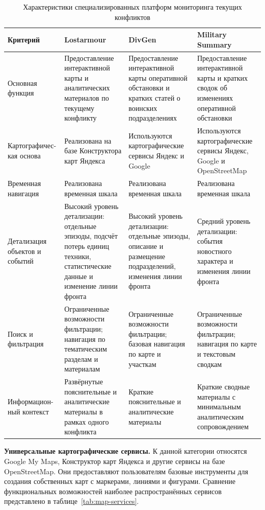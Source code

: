 \begin{table}[H]
\caption{\label{tab:specialized-platforms}Характеристики специализированных платформ мониторинга текущих конфликтов}
\centering
{\footnotesize
\begin{tabular}{|p{2.2cm}|p{4.2cm}|p{4.2cm}|p{4.2cm}|}
\hline
\textbf{Критерий} & \textbf{Lostarmour} & \textbf{DivGen} & \textbf{Military Summary} \\ \hline
Основная функция & Предоставление интерактивной карты и аналитических материалов по текущему конфликту & Предоставление интерактивной карты оперативной обстановки и кратких статей о воинских подразделениях & Предоставление интерактивной карты и кратких сводок об изменениях оперативной обстановки \\ \hline
Картографичес-кая основа & Реализована на базе Конструктора карт Яндекса & Используются картографические сервисы Яндекс и Google & Используются картографические сервисы Яндекс, Google и OpenStreetMap \\ \hline
Временная навигация & Реализована временная шкала & Реализована временная шкала & Реализована временная шкала \\ \hline
Детализация объектов и событий & Высокий уровень детализации: отдельные эпизоды, подсчёт потерь единиц техники, статистические данные и изменение линии фронта & Высокий уровень детализации: отдельные эпизоды, описание и размещение подразделений, изменения линии фронта & Средний уровень детализации: события новостного характера и изменения линии фронта \\ \hline
Поиск и фильтрация & Ограниченные возможности фильтрации; навигация по тематическим разделам и материалам & Ограниченные возможности фильтрации; базовая навигация по карте и участкам & Ограниченные возможности фильтрации; навигация по карте и текстовым сводкам \\ \hline
Информацион-ный контекст & Развёрнутые пояснительные и аналитические материалы в рамках одного конфликта & Краткие пояснительные и аналитические материалы & Краткие сводные материалы с минимальным аналитическим сопровождением \\ \hline
\end{tabular}}
\end{table}

\textbf{Универсальные картографические сервисы.} К данной категории относятся Google My Maps, Конструктор карт Яндекса и другие сервисы на базе OpenStreetMap. Они предоставляют пользователям базовые инструменты для создания собственных карт с маркерами, линиями и фигурами. Сравнение функциональных возможностей наиболее распространённых сервисов представлено в таблице~\ref{tab:map-services}.

